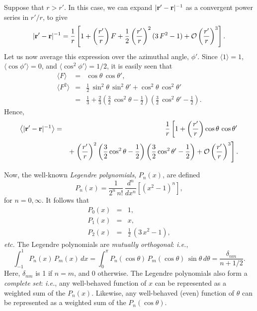 Suppose that $r > r'$. In this case, we can expand $|{\bf r}'-{\bf r}|^{-1}$
as a convergent power series in $r'/r$, to give
\begin{equation}
|{\bf r}'-{\bf r}|^{-1}= \frac{1}{r}\left[
1 + \left(\frac{r'}{r}\right)F + \frac{1}{2}\left(\frac{r'}{r}\right)^2(3\,F^2-1)
+ {\cal O}\left(\frac{r'}{r}\right)^3\right].
\end{equation}
Let us now average this expression over the azimuthal angle, $\phi'$. Since
$\langle 1\rangle =1$, $\langle\cos\phi'\rangle = 0$, and $\langle \cos^2\phi'\rangle = 1/2$, it is easily seen that
\begin{eqnarray}
\langle F\rangle &=&\cos\theta\,\cos\theta',\\[0.5ex]
\langle F^2\rangle &=& \frac{1}{2}\,\sin^2\theta\,\sin^2\theta'
+ \cos^2\theta\,\cos^2\theta'\nonumber\\[0.5ex]
&=& \frac{1}{3}+ \frac{2}{3}\left(\frac{3}{2}\,\cos^2\theta-\frac{1}{2}\right)\left(\frac{3}{2}\,\cos^2\theta'-\frac{1}{2}\right).
\end{eqnarray}
Hence,
\begin{eqnarray}\label{e13.21}
\left\langle |{\bf r}'-{\bf r}|^{-1}\right\rangle&=& \frac{1}{r}\left[
1 + \left(\frac{r'}{r}\right)\cos\theta\,\cos\theta' \right.\\[0.5ex]
&&+\left.\left(\frac{r'}{r}\right)^2\left(\frac{3}{2}\cos^2\theta-\frac{1}{2}\right)\left(\frac{3}{2}\cos^2\theta'-\frac{1}{2}\right)
+ {\cal O}\left(\frac{r'}{r}\right)^3\right].\nonumber
\end{eqnarray}

Now, the well-known {\em Legendre polynomials}, $P_n(x)$, are defined
\begin{equation}
P_n(x) = \frac{1}{2^n\,n!}\,\frac{d^n}{dx^n}\!\left[(x^2-1)^n\right],
\end{equation}
for $n=0,\infty$.
It follows that
\begin{eqnarray}
P_0(x) &=& 1,\label{e13.23}\\[0.5ex]
P_1(x) &=& x,\\[0.5ex]
P_2(x) &=& \frac{1}{2}\,(3\,x^2-1),\label{e13.25}
\end{eqnarray}
{\em etc.}
The Legendre polynomials are {\em mutually
orthogonal}: {\em i.e.},
\begin{equation}\label{e13.26}
\int_{-1}^1 P_n(x)\,P_m(x)\,dx = \int_0^\pi P_n(\cos\theta)\,P_m(\cos\theta)\,\sin\theta\,d\theta = \frac{\delta_{nm}}{n+1/2}.
\end{equation}
Here, $\delta_{nm}$ is 1 if $n=m$, and 0 otherwise. The Legendre polynomials also form a {\em complete set}: {\em i.e.}, any well-behaved function
of $x$ can be represented as a weighted sum of the $P_n(x)$. Likewise,
any well-behaved (even) function of $\theta$ can be represented as a weighted
sum of the $P_n(\cos\theta)$.

